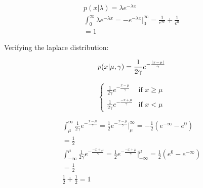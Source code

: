 \begin{gather}
  p(x|\lambda) = \lambda e^{-\lambda x} \\
  \int_{0}^{\infty} \lambda e^{-\lambda x} = -e^{-\lambda x} \Big |_0^\infty = \frac{1}{e^\infty} + \frac{1}{e^0} \\
 = 1
\end{gather}

Verifying the laplace distribution:

\begin{equation}
  p(x|\mu,\gamma) = \frac{1}{2\gamma} e^{-\frac{|x-\mu|}{\gamma}} \\
\end{equation}


\begin{equation}
  \begin{cases}
    \frac{1}{2\gamma} e^{-\frac{x-\mu}{\gamma}} & \text{if } x \geq \mu \\
    \frac{1}{2\gamma} e^{-\frac{-x+\mu}{\gamma}} & \text{if } x < \mu
  \end{cases}
\end{equation}

\begin{gather}
  \int_{\mu}^{\infty}\frac{1}{2\gamma} e^{-\frac{x-\mu}{\gamma}} = \frac{1}{2} e^{-\frac{x-\mu}{\gamma}} \Big |_\mu^\infty = -\frac{1}{2}(e^{-\infty} - e^0) \\
  = \frac{1}{2} \\
  \int_{-\infty}^{\mu}\frac{1}{2\gamma} e^{-\frac{-x+\mu}{\gamma}} = \frac{1}{2} e^{-\frac{-x+\mu}{\gamma}} \Big |_{-\infty}^\mu = \frac{1}{2}(e^{0} - e^{-\infty}) \\
  = \frac{1}{2} \\ 
  \frac{1}{2} + \frac{1}{2} = 1
\end{gather}